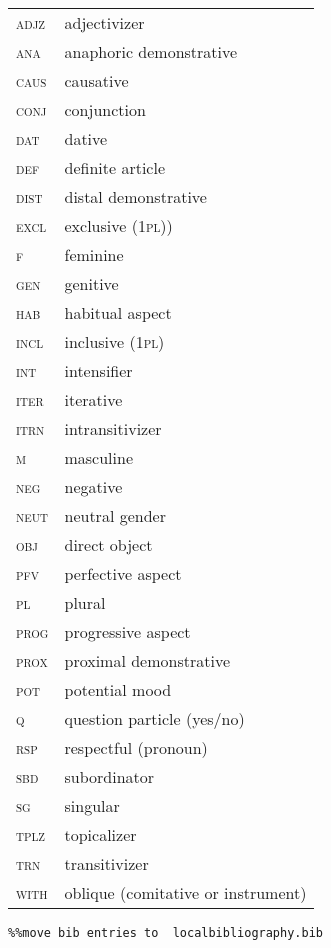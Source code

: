 \documentclass[output=paper]{../langscibook}
\begin{document}
\begin{tabularx}{.45\textwidth}{lQ}
\textsc{adjz} &  adjectivizer\\
\textsc{ana}  &  anaphoric demonstrative\\
\textsc{caus}  &  causative\\
\textsc{conj}  &  conjunction\\
\textsc{dat}  &  dative\\
\textsc{def}  &  definite article\\
\textsc{dist}  &  distal demonstrative\\
\textsc{excl}  &  exclusive (1\textsc{pl)})\\
\textsc{f}  &  feminine\\
\textsc{gen}  &  genitive\\
\textsc{hab}  &  habitual aspect\\
\textsc{incl} &  inclusive (\textsc{1pl})\\
\textsc{int}  &  intensifier\\
\textsc{iter}  &  iterative\\
\textsc{itrn}  &  intransitivizer\\
\textsc{m}  &  masculine\\
\textsc{neg}  &  negative\\
\textsc{neut}  &  neutral gender\\
\textsc{obj}  &  direct object\\
\textsc{pfv}  &  perfective aspect\\
\textsc{pl}  &  plural\\
\textsc{prog}  &  progressive aspect\\
\textsc{prox}  &  proximal demonstrative\\
\textsc{pot}  &  potential mood\\
\textsc{q}  &  question particle (yes/no)\\
\textsc{rsp}  &  respectful (pronoun)\\
\textsc{sbd}  &  subordinator\\
\textsc{sg}  &  singular\\
\textsc{tplz}  &  topicalizer\\
\textsc{trn}  &  transitivizer\\
\textsc{with} &  oblique (comitative or instrument)\\
\end{tabularx}


\begin{verbatim}%%move bib entries to  localbibliography.bib


\end{verbatim}
\sloppy\printbibliography[heading=subbibliography,notkeyword=this]
\end{document}
